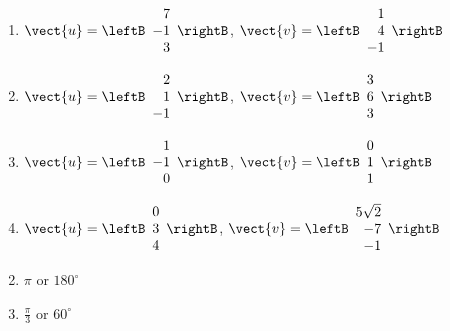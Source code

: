 \begin{multicols}{2}
\begin{ex}
\begin{enumerate}[label={\alph*.}]
\item $\vect{u} = \leftB
\begin{array}{r}
7\\
-1\\
3
\end{array}
\rightB$, 
$\vect{v} = \leftB
\begin{array}{r}
1\\
4\\
-1
\end{array}
\rightB
$

\item $\vect{u} = \leftB
\begin{array}{r}
2\\
1\\
-1
\end{array}
\rightB$, 
$\vect{v} = \leftB
\begin{array}{r}
3\\
6\\
3
\end{array}
\rightB
$

\item $\vect{u} = \leftB
\begin{array}{r}
1\\
-1\\
0
\end{array}
\rightB$, 
$\vect{v} = \leftB
\begin{array}{r}
0\\
1\\
1
\end{array}
\rightB
$

\item $\vect{u} = \leftB
\begin{array}{r}
0\\
3\\
4
\end{array}
\rightB$, 
$\vect{v} = \leftB
\begin{array}{r}
5\sqrt{2}\\
-7\\
-1
\end{array}
\rightB
$


\end{enumerate}
\begin{sol}
\begin{enumerate}[label={\alph*.}]
\setcounter{enumi}{1}
\item  $\pi$ or $180^\circ$ 

\setcounter{enumi}{3}
\item  $\frac{\pi}{3}$ or $60^\circ$


\end{enumerate}
\end{sol}
\end{ex}
\end{multicols}
